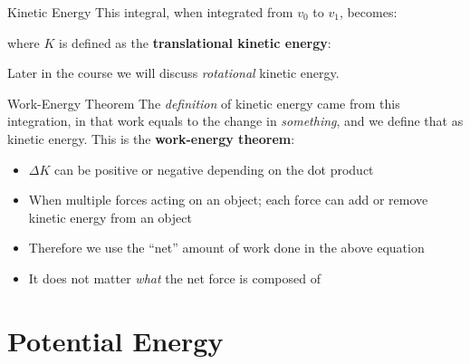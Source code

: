 \documentclass[12pt,compress,aspectratio=169]{beamer}
\begin{document}
\begin{frame}{Kinetic Energy}
  This integral, when integrated from $v_0$ to $v_1$, becomes:

  
  where $K$ is defined as the \textbf{translational kinetic energy}:


  Later in the course we will discuss \emph{rotational} kinetic energy.
\end{frame}



\begin{frame}{Work-Energy Theorem}
  The \emph{definition} of kinetic energy came from this integration, in that
  work equals to the change in \emph{something}, and we define that as kinetic
  energy. This is the \textbf{work-energy theorem}:

  \begin{itemize}
  \item $\Delta K$ can be positive or negative depending on the dot product
  \item When multiple forces acting on an object; each force can add or remove
    kinetic energy from an object
  \item Therefore we use the ``net'' amount of work done in the above equation
  \item It does not matter \emph{what} the net force is composed of
  \end{itemize}
\end{frame}






\section{Potential Energy}
\end{document}

